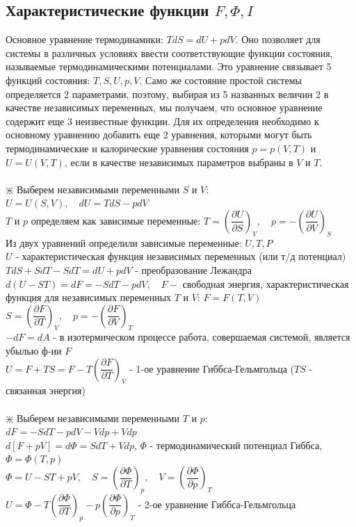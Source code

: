\begin{multicols*}{2}
		\section{Характеристические функции $F, \Phi, I$}

		Основное уравнение термодинамики: $TdS = dU + pdV$. Оно позволяет для системы в различных условиях ввести соответствующие функции состояния, называемые термодинамическими потенциалами. Это уравнение связывает 5 функций состояния: $T, S, U, p, V$. Само же состояние простой системы определяется 2 параметрами, поэтому, выбирая из 5 названных величин 2 в качестве независимых переменных, мы получаем, что основное уравнение содержит еще 3 неизвестные функции. Для их определения необходимо к основному уравнению добавить еще 2 уравнения, которыми могут быть термодинамические и калорические уравнения состояния $p = p(V, T)$ и $U = U(V, T)$, если в качестве независимых параметров выбраны в $V$ и $T$.\\\\

		$\divideontimes$ Выберем независимыми переменными $S$ и $V$:\\
		$U = U(S,V), \quad dU = TdS - pdV$\\
		$T$ и $p$ определяем как зависимые переменные: $T = \left(\dfrac{\partial U}{\partial S}\right)_V, \quad p = - \left(\dfrac{\partial U}{\partial V}\right)_S$\\
		Из двух уравнений определили зависимые переменные: $U, T, P$\\
		$U$ - характеристическая функция независимых переменных (или т/д потенциал)\\
		$TdS+SdT-SdT = dU+pdV$ - преобразование Лежандра\\
		$d(U-ST) = dF = -SdT - pdV, \quad F -$ свободная энергия, характеристическая функция для независимых переменных $T$ и $V$: $F = F(T, V)$\\
		$S = \left(\dfrac{\partial F}{\partial T}\right)_V, \quad p = - \left(\dfrac{\partial F}{\partial V}\right)_T$\\	
		$-dF = dA$ - в изотермическом процессе работа, совершаемая системой, является убылью ф-ии $F$\\
		$U = F+TS = F-T\left(\dfrac{\partial F}{\partial T}\right)_V$ - 1-ое уравнение Гиббса-Гельмгольца ($TS$ - связанная энергия)\\\\

		$\divideontimes$ Выберем независимыми переменными $T$ и $p$:\\
		$dF = -SdT - pdV - Vdp + Vdp$\\
		$d\left[F + pV\right] = d\Phi = S dT + V dp$, \quad $\Phi$ - термодинамический потенциал Гиббса, \quad $\Phi = \Phi(T, p)$\\
		$\Phi = U-ST+pV, \quad S = \left(\dfrac{\partial \Phi}{\partial T}\right)_p, \quad V = \left(\dfrac{\partial \Phi}{\partial p}\right)_T$\\
		$U = \Phi - T \left(\dfrac{\partial \Phi}{\partial T}\right)_p - p \left(\dfrac{\partial \Phi}{\partial p}\right)_T$ - 2-ое уравнение Гиббса-Гельмгольца\\\\


\end{multicols*}

